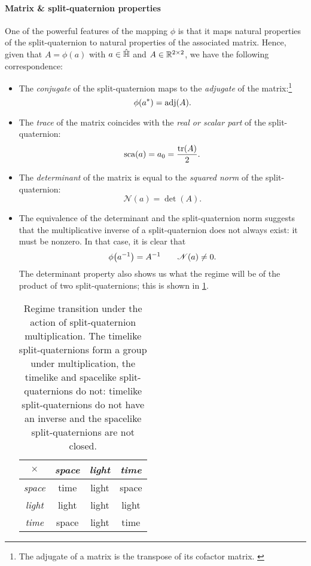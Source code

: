 \paragraph{Matrix \& split-quaternion properties} 
One of the powerful features of the mapping $\phi$ is that it maps natural properties of the split-quaternion to natural properties of the associated matrix. Hence, given that $A = \phi(a)$ with $a \in \hat{\mathbb{H}}$ and $A \in \mathbb{R}^{2\times2}$, we have the following correspondence: 
\begin{itemize}
    \item The \emph{conjugate} of the split-quaternion maps to the \emph{adjugate} of the matrix:\footnote
        {The adjugate of a matrix is the transpose of its cofactor matrix. \cite{Verhaegen2007}}
        $$ \phi(a^*) = \operatorname{adj}(A). $$
    \item The \emph{trace} of the matrix coincides with the \emph{real or scalar part} of the split-quaternion:
        $$ \scapart{a} = a_0 = \frac{\trace(A)}{2}. $$
    \item The \emph{determinant} of the matrix is equal to the \emph{squared norm} of the split-quaternion:
        $$ \mathscr{N}(a) = \det(A). $$
    \item The equivalence of the determinant and the split-quaternion norm suggests that the multiplicative inverse of a split-quaternion does not always exist: it must be nonzero. In that case, it is clear that
        $$ \phi\qty(a^{-1}) = A^{-1} \qquad \mathscr{N}(a) \neq 0. $$
    The determinant property also shows us what the regime will be of the product of two split-quaternions; this is shown in \cref{tab:multiplication_class}.
        \begin{table}[h!]
        \centering
        \caption{Regime transition under the action of split-quaternion multiplication. The timelike split-quaternions form a group under multiplication, the timelike and spacelike split-quaternions do not: timelike split-quaternions do not have an inverse and the spacelike split-quaternions are not closed.}
        \label{tab:multiplication_class}
        \begin{tabular}{c|ccc}
            \toprule
            $\times$ & \emph{space} & \emph{light} & \emph{time} \\[1mm]
            \hline
            \emph{space} & time  & light & space \\
            \emph{light} & light & light & light \\
            \emph{time} &  space & light & time \\

\end{tabular}
\end{table}
\end{itemize}
